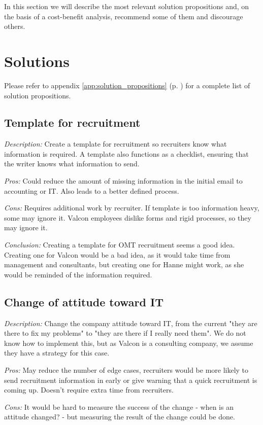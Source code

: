 In this section we will describe the most relevant solution propositions and, on the basis of a cost-benefit analysis, recommend some of them and discourage others.

\section{Solutions}
Please refer to appendix \ref{app:solution_propositions} (p. \pageref{app:solution_propositions}) for a complete list of solution propositions.

\subsection{Template for recruitment}
\emph{Description:} Create a template for recruitment so recruiters know what information is required. A template also functions as a checklist, ensuring that the writer knows what information to send.

\emph{Pros:} Could reduce the amount of missing information in the initial email to accounting or IT. 
Also leads to a better defined process.

\emph{Cons:} Requires additional work by recruiter. 
If template is too information heavy, some may ignore it.
Valcon employees dislike forms and rigid processes, so they may ignore it.

\emph{Conclusion:} Creating a template for OMT recruitment seems a good idea.
Creating one for Valcon would be a bad idea, as it would take time from management and consultants, but creating one for Hanne might work, as she would be reminded of the information required.

\subsection{Change of attitude toward IT}
\emph{Description:} Change the company attitude toward IT, from the current "they are there to fix my problems" to "they are there if I really need them".
We do not know how to implement this, but as Valcon is a consulting company, we assume they have a strategy for this case.

\emph{Pros:} May reduce the number of edge cases, recruiters would be more likely to send recruitment information in early or give warning that a quick recruitment is coming up.
Doesn't require extra time from recruiters.

\emph{Cons:} It would be hard to measure the success of the change - when is an attitude changed? - but measuring the result of the change could be done.

